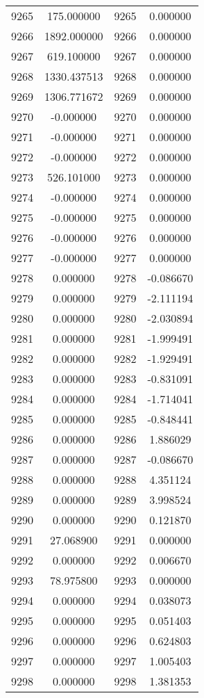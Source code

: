\documentclass[12pt]{article}
\begin{document}
\begin{longtable}{@{}cccc@{}}
9265 & 175.000000 & 9265 & 0.000000 \\
9266 & 1892.000000 & 9266 & 0.000000 \\
9267 & 619.100000 & 9267 & 0.000000 \\
9268 & 1330.437513 & 9268 & 0.000000 \\
9269 & 1306.771672 & 9269 & 0.000000 \\
9270 & -0.000000 & 9270 & 0.000000 \\
9271 & -0.000000 & 9271 & 0.000000 \\
9272 & -0.000000 & 9272 & 0.000000 \\
9273 & 526.101000 & 9273 & 0.000000 \\
9274 & -0.000000 & 9274 & 0.000000 \\
9275 & -0.000000 & 9275 & 0.000000 \\
9276 & -0.000000 & 9276 & 0.000000 \\
9277 & -0.000000 & 9277 & 0.000000 \\
9278 & 0.000000 & 9278 & -0.086670 \\
9279 & 0.000000 & 9279 & -2.111194 \\
9280 & 0.000000 & 9280 & -2.030894 \\
9281 & 0.000000 & 9281 & -1.999491 \\
9282 & 0.000000 & 9282 & -1.929491 \\
9283 & 0.000000 & 9283 & -0.831091 \\
9284 & 0.000000 & 9284 & -1.714041 \\
9285 & 0.000000 & 9285 & -0.848441 \\
9286 & 0.000000 & 9286 & 1.886029 \\
9287 & 0.000000 & 9287 & -0.086670 \\
9288 & 0.000000 & 9288 & 4.351124 \\
9289 & 0.000000 & 9289 & 3.998524 \\
9290 & 0.000000 & 9290 & 0.121870 \\
9291 & 27.068900 & 9291 & 0.000000 \\
9292 & 0.000000 & 9292 & 0.006670 \\
9293 & 78.975800 & 9293 & 0.000000 \\
9294 & 0.000000 & 9294 & 0.038073 \\
9295 & 0.000000 & 9295 & 0.051403 \\
9296 & 0.000000 & 9296 & 0.624803 \\
9297 & 0.000000 & 9297 & 1.005403 \\
9298 & 0.000000 & 9298 & 1.381353 \\

\end{longtable}
\end{document}
